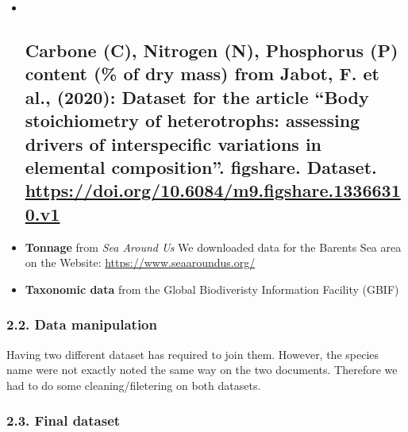 \documentclass[
]{article}
\begin{document}
\begin{itemize}
\item ~
  \hypertarget{carbone-c-nitrogen-n-phosphorus-p-content-of-dry-mass-from-jabot-f.-et-al.-2020-dataset-for-the-article-body-stoichiometry-of-heterotrophs-assessing-drivers-of-interspecific-variations-in-elemental-composition.-figshare.-dataset.-httpsdoi.org10.6084m9.figshare.13366310.v1}{%
  \subsection{\texorpdfstring{\textbf{Carbone (C), Nitrogen (N),
  Phosphorus (P)} content (\% of dry mass) from Jabot, F. et al.,
  (2020): Dataset for the article ``Body stoichiometry of heterotrophs:
  assessing drivers of interspecific variations in elemental
  composition''. figshare. Dataset.
  \url{https://doi.org/10.6084/m9.figshare.13366310.v1}}{Carbone (C), Nitrogen (N), Phosphorus (P) content (\% of dry mass) from Jabot, F. et al., (2020): Dataset for the article ``Body stoichiometry of heterotrophs: assessing drivers of interspecific variations in elemental composition''. figshare. Dataset. https://doi.org/10.6084/m9.figshare.13366310.v1}}\label{carbone-c-nitrogen-n-phosphorus-p-content-of-dry-mass-from-jabot-f.-et-al.-2020-dataset-for-the-article-body-stoichiometry-of-heterotrophs-assessing-drivers-of-interspecific-variations-in-elemental-composition.-figshare.-dataset.-httpsdoi.org10.6084m9.figshare.13366310.v1}}
\item
  \textbf{Tonnage} from \emph{Sea Around Us} We downloaded data for the
  Barents Sea area on the Website: \url{https://www.seaaroundus.org/}
\item
  \textbf{Taxonomic data} from the Global Biodiveristy Information
  Facility (GBIF)
\end{itemize}

\hypertarget{data-manipulation}{%
\subsubsection{2.2. Data manipulation}\label{data-manipulation}}

Having two different dataset has required to join them. However, the
species name were not exactly noted the same way on the two documents.
Therefore we had to do some cleaning/filetering on both datasets.

\hypertarget{final-dataset}{%
\subsubsection{2.3. Final dataset}\label{final-dataset}}
\end{document}
